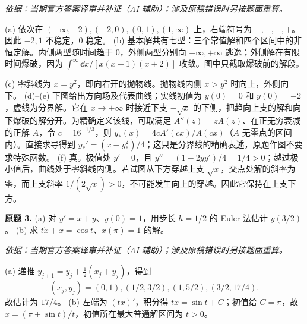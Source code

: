 \begin{solution}
\textit{依据：当期官方答案译审并补证（AI 辅助）；涉及原稿错误时另按题面重算。}\par
(a) 依次在 $(-\infty,-2),(-2,0),(0,1),(1,\infty)$ 上，右端符号为 $-,+,-,+$。因此 $-2,1$ 不稳定，$0$ 稳定。
(b) 基本解共有七型：三个常值解和四个区间中的非恒定解。内侧两型随时间趋于 $0$，外侧两型分别向 $-\infty,+\infty$ 逃逸；外侧解在有限时间爆破，因为 $\int^\infty\dd x/[x(x-1)(x+2)]$ 收敛。图中只截取爆破前的解段。
\begin{center}\end{center}
(c) 零斜线为 $x=y^2$，即向右开的抛物线。抛物线内侧 $x>y^2$ 时向上，外侧向下。
(d)--(e) 下图给出方向场及代表曲线；实线初值为 $y(0)=0$ 和 $y(0)=-2$，虚线为分界解。它在 $x\to+\infty$ 时接近下支 $-\sqrt x$ 的下侧，把趋向上支的解和向下爆破的解分开。为精确定义该线，可取满足 $A''(z)=zA(z)$、在正无穷衰减的正解 $A$，令 $c=16^{-1/3}$，则 $y_*(x)=4c A'(cx)/A(cx)$（$A$ 无零点的区间内）。直接求导得到 $y_*'=(x-y_*^2)/4$；这只是分界线的精确表述，原题作图不要求特殊函数。
\ODEExamRiccatiField
(f) 真。极值处 $y'=0$，且 $y''=(1-2yy')/4=1/4>0$；越过极小值后，曲线处于零斜线内侧。若试图从下方穿越上支 $\sqrt x$，交点处解的斜率为零，而上支斜率 $1/(2\sqrt x)>0$，不可能发生向上的穿越。因此它保持在上支下方。
\end{solution}
\begin{exercise}\label{cw:ex1-3}\textbf{原题 3.}
(a) 对 $y'=x+y$、$y(0)=1$，用步长 $h=1/2$ 的 Euler 法估计 $y(3/2)$。
(b) 求 $t\dot x+x=\cos t$、$x(\pi)=1$ 的解。
\end{exercise}
\begin{solution}
\textit{依据：当期官方答案译审并补证（AI 辅助）；涉及原稿错误时另按题面重算。}\par
(a) 递推 $y_{j+1}=y_j+\tfrac12(x_j+y_j)$，得到
\[ (x_j,y_j)=(0,1),(1/2,3/2),(1,5/2),(3/2,17/4). \]
故估计为 $17/4$。
(b) 左端为 $(tx)'$，积分得 $tx=\sin t+C$；初值给 $C=\pi$，故 $x=(\pi+\sin t)/t$，初值所在最大普通解区间为 $t>0$。
\end{solution}

